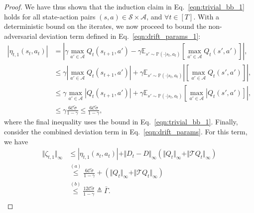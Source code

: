 \documentclass{article}
\newcommand{\mc}{\mathcal}
\begin{document}
\begin{proof}
We have thus shown that the induction claim in Eq.~\eqref{eqn:trivial_bb_1} holds for all state-action pairs \((s,a) \in \mc{S} \times \mc{A}\), and $\forall t \in [T]$. With a deterministic bound on the iterates, we now proceed to bound the non-adversarial deviation term defined in Eq.~\eqref{eqn:drift_params_1}:
\begin{equation*}
\begin{aligned}
\left| \eta_{t,1}(s_t,a_t) \right| &= \left| \gamma \max_{a' \in \mathcal{A}} Q_t(s_{t+1}, a') - \gamma \mathbb{E}_{s' \sim \mathbb{P}(\cdot|s_t,a_t)} \left[ \max_{a' \in \mathcal{A}} Q_t(s', a') \right] \right|, \\
&\le \gamma \left|\max_{a' \in \mathcal{A}}  Q_t(s_{t+1}, a') \right| + \gamma \mathbb{E}_{s' \sim \mathbb{P}(\cdot|s_t,a_t)} \left|\left[ \max_{a' \in \mathcal{A}}  Q_t(s', a')  \right]\right|, \\
&\le \gamma \max_{a' \in \mathcal{A}}  \left|Q_t(s_{t+1}, a')\right|  + \gamma \mathbb{E}_{s' \sim \mathbb{P}(\cdot|s_t,a_t)} \left[ \max_{a' \in \mathcal{A}}  \left| Q_t(s', a')  \right]\right|, \\
&\le \gamma \frac{6 \mathcal{C} \tilde{\sigma}}{1 - \gamma} \le \frac{6 \mathcal{C} \tilde{\sigma}}{1 - \gamma},
\end{aligned}
\end{equation*}
where the final inequality uses the bound in Eq.~\eqref{eqn:trivial_bb_1}. 
Finally, consider the combined deviation term in Eq.~\eqref{eqn:drift_params}. For this term, we have
\begin{equation*}
\begin{aligned}
\Vert \zeta_{t,1} \Vert_{\infty} &\le \left| \eta_{t,1}(s_t,a_t) \right| + \Vert D_t - D \Vert_{\infty} \left( \Vert Q_t \Vert_{\infty} + \Vert \mc{T} Q_t \Vert_{\infty} \right)
\\
&\overset{(a)}{\le} \frac{6 \mathcal{C} \tilde{\sigma}}{1 - \gamma} + \left( \Vert Q_t \Vert_{\infty} + \Vert \mc{T} Q_t \Vert_{\infty} \right) \\
&\overset{(b)}{\le} \frac{12 \mathcal{C} \tilde{\sigma}}{1 - \gamma} \triangleq \bar{\Gamma}. \\

\end{aligned}
\end{equation*}
\end{proof}
\end{document}
